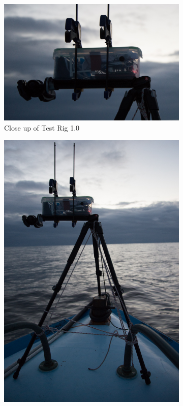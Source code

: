 
\begin{figure}
\centering
\begin{subfigure}{.65\textwidth}
  \centering
  \includegraphics[width=.95\linewidth]{"./image/20150219-_BEN2653"}
  \caption{Close up of Test Rig 1.0}
  \label{fig:test_rig_1.0_tofino:sub1}
\end{subfigure}%
\begin{subfigure}{.35\textwidth}
  \centering
  \includegraphics[width=.95\linewidth]{"./image/20150219-_BEN2655"}

\end{subfigure}
\end{figure}

